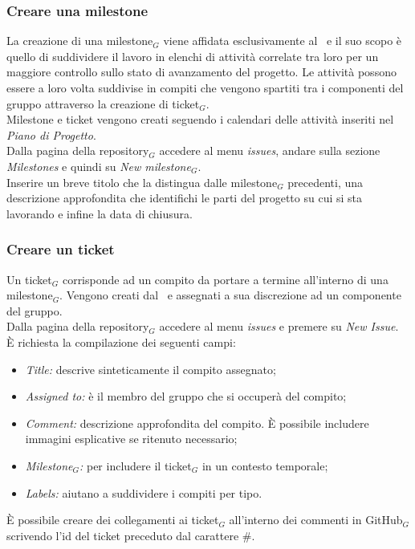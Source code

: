 \subsubsection{Creare una milestone}
La creazione di una milestone$_G$ viene affidata esclusivamente al \ruoloResponsabile\ e il suo scopo è quello di suddividere il lavoro in elenchi di attività correlate tra loro per un maggiore controllo sullo stato di avanzamento del progetto. Le attività possono essere a loro volta suddivise in compiti che vengono spartiti tra i componenti del gruppo attraverso la creazione di ticket$_G$. \\
Milestone e ticket vengono creati seguendo i calendari delle attività inseriti nel \textit{Piano di Progetto}. \\
    Dalla pagina della repository$_G$ accedere al menu \textit{issues}, andare sulla sezione \textit{Milestones} e quindi su \textit{New milestone$_G$}.\\
    Inserire un breve titolo che la distingua dalle milestone$_G$ precedenti, una descrizione approfondita che identifichi le parti del progetto su cui si sta lavorando e infine la data di chiusura.

\subsubsection{Creare un ticket}
Un ticket$_G$ corrisponde ad un compito da portare a termine all'interno di una milestone$_G$. Vengono creati dal \ruoloResponsabile\ e assegnati a sua discrezione ad un componente del gruppo. \\
Dalla pagina della repository$_G$ accedere al menu \textit{issues} e premere su \textit{New Issue}.\\
È richiesta la compilazione dei seguenti campi:
\begin{itemize}
    \item \textit{Title:} descrive sinteticamente il compito assegnato;
    \item \textit{Assigned to:} è il membro del gruppo che si occuperà del compito;
    \item \textit{Comment:} descrizione approfondita del compito. È possibile includere immagini esplicative se ritenuto necessario;
    \item \textit{Milestone$_G$:} per includere il ticket$_G$ in un contesto temporale;
    \item \textit{Labels:} aiutano a suddividere i compiti per tipo.
\end{itemize}
È possibile creare dei collegamenti ai ticket$_G$ all'interno dei commenti in GitHub$_G$ scrivendo l'id del ticket preceduto dal carattere \#.

